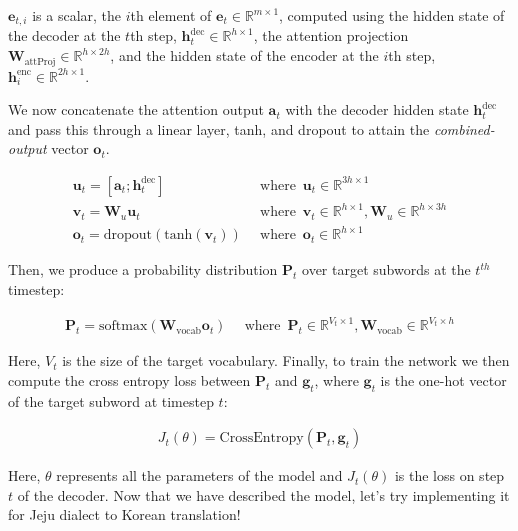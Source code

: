 \documentclass{assignment format}
\newcommand{\Real}{\mathbb{R}}
\newcommand{\henc}{\mathbf{h}^{\text{enc}}}
\newcommand{\hdec}{\mathbf{h}^{\text{dec}}}
\begin{document}
$\mathbf{e}_{t, i}$ is a scalar, the $i$th element of $\mathbf{e}_{t} \in \Real^{m \times 1}$, computed using the hidden state of the decoder at the $t$th step, $\hdec_t \in \Real^{h \times 1}$, the attention projection $\mathbf{W}_{\text{attProj}} \in \Real^{h \times 2h}$, and the hidden state of the encoder at the $i$th step, $\henc_i \in \Real^{2h \times 1}$.

We now concatenate the attention output $\mathbf{a}_t$ with the decoder hidden state $\hdec_t$ and pass this through a linear layer, tanh, and dropout to attain the \textit{combined-output} vector $\mathbf{o}_{t}$.

\begin{align}   
    \mathbf{u}_{t} = [\mathbf{a}_{t}; \hdec_t] \enspace &\text{where} \enspace \mathbf{u}_t \in  \Real^{3h \times 1} \\
    \mathbf{v}_t = \mathbf{W}_{u}\mathbf{u}_t \enspace &\text{where} \enspace \mathbf{v}_t \in \Real^{h \times 1}, \mathbf{W}_{u} \in \Real^{h \times 3h}\\
    \mathbf{o}_t = \text{dropout}(\text{tanh}(\mathbf{v}_t)) \enspace &\text{where} \enspace \mathbf{o}_t \in \Real^{h \times 1}
\end{align}

Then, we produce a probability distribution $\mathbf{P}_t$ over target subwords at the $t^{th}$ timestep:

\begin{align}
    \mathbf{P}_t = \text{softmax}(\mathbf{W}_{\text{vocab}}\mathbf{o}_{t}) \enspace &\text{where} \enspace \mathbf{P}_t \in \Real^{V_{t} \times 1}, \mathbf{W}_{\text{vocab}} \in \Real^{V_{t} \times h}
\end{align}

Here, $V_{t}$ is the size of the target vocabulary. Finally, to train the network we then compute the cross entropy loss between $\mathbf{P}_t$ and $\mathbf{g}_{t}$, where $\mathbf{g}_{t}$ is the one-hot vector of the target subword at timestep $t$:

\begin{align}
    J_t(\theta) = \mathrm{CrossEntropy}(\mathbf{P}_t,\mathbf{g}_{t})
\end{align}

Here, $\theta$ represents all the parameters of the model and $J_t(\theta)$ is the loss on step $t$ of the decoder.
Now that we have described the model, let's try implementing it for Jeju dialect to Korean translation!
\end{document}
